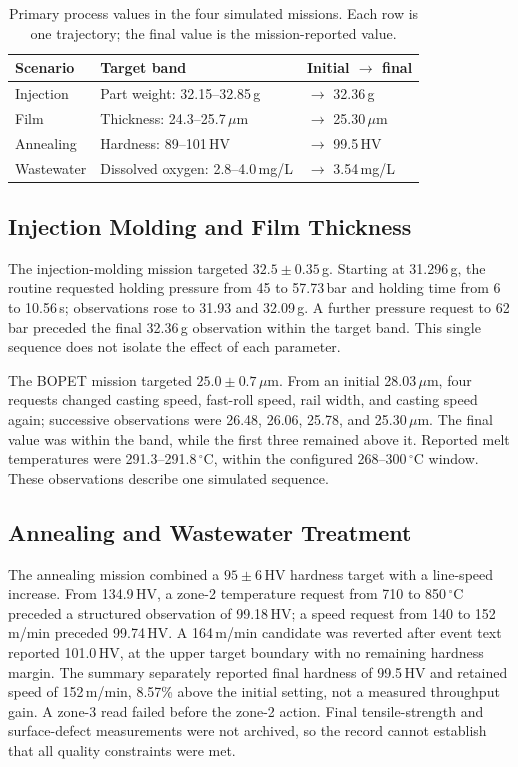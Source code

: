 \begin{table}[!t]
\centering
\caption{Primary process values in the four simulated missions. Each row is
one trajectory; the final value is the mission-reported value.}
\label{tab:missions}
\footnotesize
\setlength{\tabcolsep}{3pt}
\begin{tabularx}{\columnwidth}{@{}>{\raggedright\arraybackslash}p{1.30cm}>{\raggedright\arraybackslash}X>{\raggedright\arraybackslash}p{2.55cm}@{}}
\toprule
Scenario & Target band & Initial $\rightarrow$ final \\
\midrule
Injection & Part weight: 32.15--32.85\,g & 31.296 $\rightarrow$ 32.36\,g \\
Film & Thickness: 24.3--25.7\,$\mu$m & 28.03 $\rightarrow$ 25.30\,$\mu$m \\
Annealing & Hardness: 89--101\,HV & 134.9 $\rightarrow$ 99.5\,HV \\
Wastewater & Dissolved oxygen: 2.8--4.0\,mg/L & 0.194 $\rightarrow$ 3.54\,mg/L \\
\bottomrule
\end{tabularx}
\end{table}

\subsection{Injection Molding and Film Thickness}
The injection-molding mission targeted $32.5\pm0.35$\,g. Starting at
31.296\,g, the routine requested holding pressure from 45 to 57.73\,bar and
holding time from 6 to 10.56\,s; observations rose to 31.93 and 32.09\,g.
A further pressure request to 62\,bar preceded the final 32.36\,g observation
within the target band. This single sequence does not isolate the effect of
each parameter.

The BOPET mission targeted $25.0\pm0.7$\,$\mu$m. From an initial
28.03\,$\mu$m, four requests changed casting speed, fast-roll speed, rail
width, and casting speed again; successive observations were 26.48, 26.06,
25.78, and 25.30\,$\mu$m. The final value was within the band, while the
first three remained above it. Reported melt temperatures were
291.3--291.8\,$^{\circ}$C, within the configured 268--300\,$^{\circ}$C
window. These observations describe one simulated sequence.

\subsection{Annealing and Wastewater Treatment}
The annealing mission combined a $95\pm6$\,HV hardness target with a
line-speed increase. From 134.9\,HV, a zone-2 temperature request from 710 to
850\,$^{\circ}$C preceded a structured observation of 99.18\,HV; a speed
request from 140 to 152\,m/min preceded 99.74\,HV. A 164\,m/min candidate
was reverted after event text reported 101.0\,HV, at the upper target boundary
with no remaining hardness margin. The summary separately reported final
hardness of 99.5\,HV and retained speed of 152\,m/min, 8.57\% above the initial
setting, not a measured throughput gain. A zone-3 read failed before the
zone-2 action. Final tensile-strength and surface-defect measurements were
not archived, so the record cannot establish that all quality constraints
were met.

